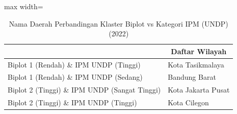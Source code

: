 \begin{table}[H]
\centering
\caption{Nama Daerah Perbandingan Klaster Biplot vs Kategori IPM (UNDP) (2022)} \label{tab:sample2crossname2022}
\begin{adjustbox}{max width=\textwidth}
\begin{tabular}{|>{\centering\arraybackslash}p{4cm}|p{10cm}|}
\hline
\multicolumn{1}{|c|}{\textbf{Kategori}} & \multicolumn{1}{c|}{\textbf{Daftar Wilayah}} \\
\hline
Biplot 1 (Rendah) \& IPM UNDP (Tinggi) & Kota Tasikmalaya \\
\hline
Biplot 1 (Rendah) \& IPM UNDP (Sedang) & Bandung Barat \\
\hline
Biplot 2 (Tinggi) \& IPM UNDP (Sangat Tinggi) & Kota Jakarta Pusat \\
\hline
Biplot 2 (Tinggi) \& IPM UNDP (Tinggi) & Kota Cilegon \\
\hline
\end{tabular}
\end{adjustbox}
\end{table}